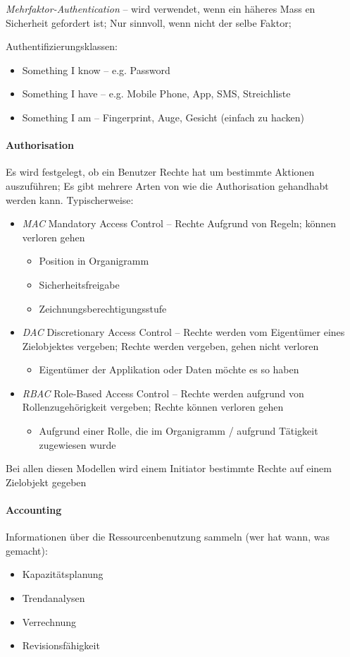 \documentclass[a4paper,12pt]{article}
\begin{document}
\emph{Mehrfaktor-Authentication} -- wird verwendet, wenn ein häheres Mass en Sicherheit gefordert ist; Nur sinnvoll, wenn nicht der selbe Faktor;

Authentifizierungsklassen:
\begin{itemize}
\item Something I know -- e.g. Password
\item Something I have -- e.g. Mobile Phone, App, SMS, Streichliste
\item Something I am -- Fingerprint, Auge, Gesicht (einfach zu hacken)
\end{itemize}

\paragraph{Authorisation} Es wird festgelegt, ob ein Benutzer Rechte hat um bestimmte Aktionen auszuführen; Es gibt mehrere Arten von wie die Authorisation gehandhabt werden kann. Typischerweise:
\begin{itemize}
\item \emph{MAC} Mandatory Access Control -- Rechte Aufgrund von Regeln; können verloren gehen
  \begin{itemize}
  \item Position in Organigramm
  \item Sicherheitsfreigabe
  \item Zeichnungsberechtigungsstufe
  \end{itemize}
\item \emph{DAC} Discretionary Access Control --  Rechte werden vom Eigentümer eines Zielobjektes vergeben; Rechte werden vergeben, gehen nicht verloren
  \begin{itemize}
  \item Eigentümer der Applikation oder Daten möchte es so haben
  \end{itemize}
\item \emph{RBAC} Role-Based Access Control -- Rechte werden aufgrund von Rollenzugehörigkeit vergeben; Rechte können verloren gehen
  \begin{itemize}
  \item Aufgrund einer Rolle, die im Organigramm / aufgrund Tätigkeit zugewiesen wurde
  \end{itemize}
\end{itemize}

Bei allen diesen Modellen wird einem Initiator bestimmte Rechte auf einem Zielobjekt gegeben


\paragraph{Accounting} Informationen über die Ressourcenbenutzung sammeln (wer hat wann, was gemacht):
\begin{itemize}
\item Kapazitätsplanung
\item Trendanalysen
\item Verrechnung
\item Revisionsfähigkeit
\end{itemize}
\end{document}
